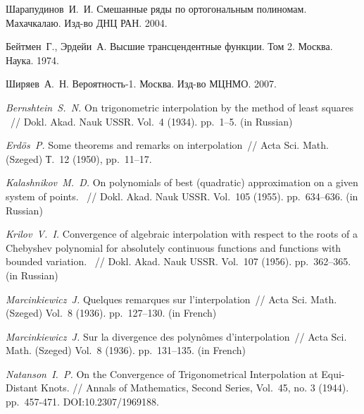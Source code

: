 \begin{thebibliography}{111}
Шарапудинов~И.~И. Смешанные ряды по ортогональным полиномам. Махачкалаю. Изд-во ДНЦ РАН. 2004.

Бейтмен~Г., Эрдейи~А. Высшие трансцендентные функции. Том 2. Москва. Наука. 1974.

Ширяев~А.~Н. Вероятность-1. Москва. Изд-во МЦНМО. 2007.


\textit{Bernshtein~S.~N.}
On trigonometric interpolation by the method of least squares
~// Dokl. Akad. Nauk USSR. Vol.~4 (1934). pp.~1--5. (in Russian)

\textit{Erd{\"o}s~P.} Some theorems and remarks on interpolation~// Acta Sci. Math. (Szeged) Т.~12 (1950), pp.~11--17.


\textit{Kalashnikov~M.~D.}
On polynomials of best (quadratic) approximation on a given system of points.
~// Dokl. Akad. Nauk USSR. Vol.~105 (1955). pp.~634--636. (in Russian)

\textit{Krilov~V.~I.}
Convergence of algebraic interpolation with respect to the roots of a Chebyshev polynomial for absolutely continuous functions and functions with bounded variation.
~// Dokl. Akad. Nauk USSR. Vol.~107 (1956). pp.~362--365. (in Russian)

\textit{Marcinkiewicz~J.} Quelques remarques sur l'interpolation~// Acta Sci. Math. (Szeged) Vol.~8 (1936). pp.~127--130. (in French)

\textit{Marcinkiewicz~J.} Sur la divergence des polyn{\^o}mes d'interpolation~// Acta Sci. Math. (Szeged) Vol.~8 (1936). pp.~131--135. (in French)

\textit{Natanson~I.~P.} On the Convergence of Trigonometrical Interpolation at Equi-Distant Knots. // Annals of Mathematics, Second Series, Vol.~45, no. 3 (1944). pp.~457-471. DOI:10.2307/1969188.


\end{thebibliography}
